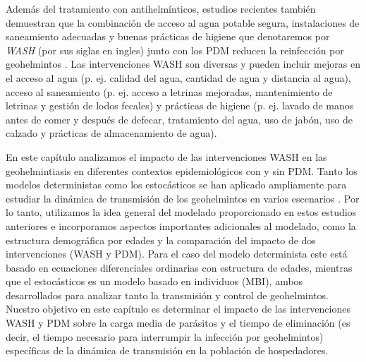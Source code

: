 \documentclass[12pt,a4paper]{article}
\theoremstyle{plain}%
\theoremstyle{definition}
\theoremstyle{remark}
\begin{document}
{Además del tratamiento con antihelmínticos, estudios recientes también demuestran que la combinación de acceso al agua potable segura, instalaciones de saneamiento adecuadas y buenas prácticas de higiene 
que denotaremos por \textit{WASH} (por sus siglas en ingles) 
junto con los PDM reducen la reinfección por geohelmintos \cite{strunz2014water}.
Las intervenciones  WASH son diversas y pueden incluir mejoras en el acceso al agua (p. ej. calidad del agua, cantidad de agua y distancia al agua), acceso al saneamiento (p. ej. acceso a letrinas mejoradas, mantenimiento de letrinas y gestión de lodos fecales) y prácticas de higiene (p. ej. lavado de manos antes de comer y después de defecar, tratamiento del agua, uso de jabón, uso de calzado y prácticas de almacenamiento de agua). 





En este capítulo analizamos el impacto de las intervenciones WASH en las geohelmintiasis en diferentes contextos epidemiológicos con y sin PDM. 
Tanto los modelos deterministas como los estocásticos se han aplicado ampliamente para estudiar la dinámica de transmisión de los geohelmintos en varios escenarios \cite{anderson1985community,anderson1992infectious,anderson2014coverage,truscott2014modeling,truscott2016soil}. Por lo tanto, utilizamos la idea general del modelado proporcionado en estos estudios anteriores e %
incorporamos aspectos importantes adicionales al modelado, como la estructura demográfica por edades y la comparación del impacto de dos intervenciones (WASH y PDM).  
Para el caso del modelo determinista este está basado en ecuaciones diferenciales ordinarias con estructura de edades, mientras que  el estocásticos es un modelo basado en individuos (MBI), ambos desarrollados para analizar tanto la transmisión y control de geohelmintos.
Nuestro objetivo en este capítulo es 
determinar el impacto de las intervenciones  WASH y PDM sobre la carga media de parásitos y el tiempo de eliminación (es decir, el tiempo necesario para interrumpir la infección por geohelmintos) específicas de la dinámica de transmisión en la población de hospedadores.

}
\end{document}
